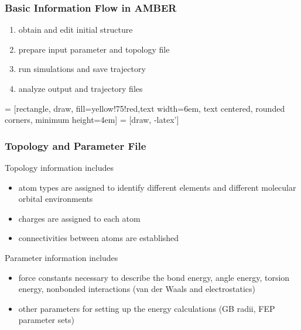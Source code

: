 \documentclass[slidestop,mathserif,compress,xcolor=svgnames]{beamer}
\newenvironment{bblock}[0]
{
\begin{beamerboxesrounded}[upper=uppercol1,lower=lowercol1,shadow=true]}
{\end{beamerboxesrounded}}
\newenvironment{eblock}[0]
{
\begin{beamerboxesrounded}[upper=uppercol2,lower=lowercol2,shadow=true]}
{\end{beamerboxesrounded}}
\begin{document}
\begin{frame}
  \frametitle{\small Basic Information Flow in AMBER}
  \begin{eblock}{}
    \begin{enumerate}
      \item obtain and edit initial structure
      \item prepare input parameter and topology file
      \item run simulations and save trajectory
      \item analyze output and trajectory files
    \end{enumerate}
    \scriptsize{
     = [rectangle, draw, fill=yellow!75!red,text width=6em, text centered, rounded corners, minimum height=4em]
     = [draw, -latex']
    }
  \end{eblock}
\end{frame}

\begin{frame}
  \frametitle{\small Topology and Parameter File}
  \begin{bblock}{Topology information includes}
    \begin{itemize}
      \item atom types are assigned to identify different elements and different molecular orbital environments
      \item charges are assigned to each atom
      \item connectivities between atoms are established
    \end{itemize}
  \end{bblock}
  \begin{bblock}{Parameter information includes}
    \begin{itemize}
      \item force constants necessary to describe the bond energy, angle energy, torsion energy, nonbonded interactions (van der Waals and electrostatics)
      \item other parameters for setting up the energy calculations (GB radii, FEP parameter sets)
    \end{itemize}
  \end{bblock}
\end{frame}
\end{document}
